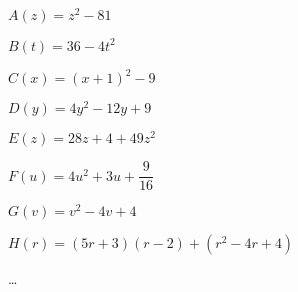 \begin{exercice*}
    $A(z)=z^2-81$\par
$B(t)=36-4t^2$\par
$C(x)=(x+1)^2-9$\par
$D(y)=4y^2-12y+9$\par
$E(z)=28z+4+49z^2$\par
$F(u)=4u^2+3u+\dfrac{9}{16}$\par
$G(v)=v^2-4v+4$\par
$H(r)=(5r+3)(r-2)+(r^2-4r+4)$
\end{exercice*}
\begin{corrige}
    \dots
\end{corrige}

